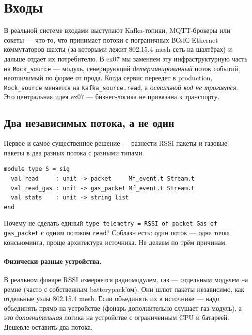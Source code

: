 
\section{Входы}\label{sec:inputs}

В реальной системе входами выступают Kafka-топики, MQTT-брокеры или
сокеты --- что-то, что принимает потоки с пограничных
ВОЛС-Ethernet коммутаторов шахты (за которыми лежит 802.15.4
mesh-сеть на шахтёрах) и
дальше отдаёт их потребителю. В ex07 мы заменяем эту инфраструктурную
часть на \texttt{Mock\_source} --- модуль, генерирующий
\emph{детерминированный} поток событий, неотличимый по форме от
прода. Когда сервис переедет в production,
\texttt{Mock\_source} меняется на \texttt{Kafka\_source.read}, а
\textit{остальной код не трогается}. Это центральная идея ex07 ---
бизнес-логика не привязана к транспорту.

\subsection{Два независимых потока, а не один}

Первое и самое существенное решение --- разнести RSSI-пакеты и
газовые пакеты в два разных потока с разными типами.

\begin{lstlisting}
module type S = sig
  val read     : unit -> packet     Mf_event.t Stream.t
  val read_gas : unit -> gas_packet Mf_event.t Stream.t
  val stats    : unit -> string list
end
\end{lstlisting}

Почему не сделать единый \texttt{type telemetry = RSSI of packet
\textbar{} Gas of gas\_packet} с одним потоком \texttt{read}?
Соблазн есть: один поток --- одна точка консьюминга, проще
архитектура источника. Не делаем по трём причинам.

\paragraph{Физически разные устройства.} В реальном фонаре RSSI
измеряется радиомодулем, газ --- отдельным модулем на ремне (часто
с собственным batterypack'ом). Они шлют пакеты независимо, как
отдельные узлы 802.15.4 mesh. Если объединять их в источнике ---
надо объединять прямо на устройстве (фонарь дополнительно слушает
газ-модуль), а это \emph{дополнительная} логика на устройстве с
ограниченным CPU и батареей. Дешевле оставить два потока.

